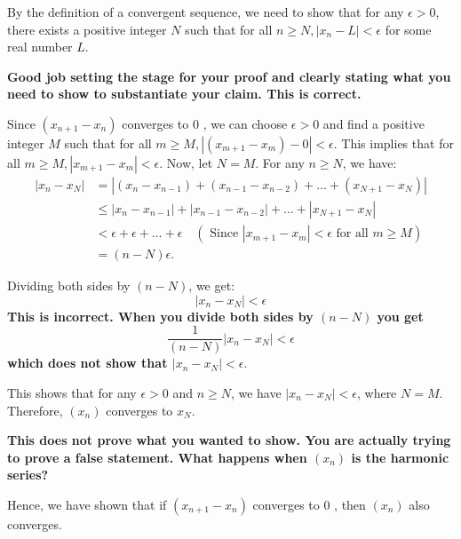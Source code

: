 \documentclass{report}
\begin{document}
By the definition of a convergent sequence, we need to show that for any $\epsilon>0$, there exists a positive integer $N$ such that for all $n \geq N,\left|x_n-L\right|<\epsilon$ for some real number $L$.

\textbf{Good job setting the stage for your proof and clearly stating what you need to show to substantiate your claim. This is correct.}

Since $\left(x_{n+1}-x_n\right)$ converges to 0 , we can choose $\epsilon>0$ and find a positive integer $M$ such that for all $m \geq M,\left|\left(x_{m+1}-x_m\right)-0\right|<\epsilon$. This implies that for all $m \geq M,\left|x_{m+1}-x_m\right|<\epsilon$.
Now, let $N=M$. For any $n \geq N$, we have:
$$
\begin{aligned}
\left|x_n-x_N\right| & =\left|\left(x_n-x_{n-1}\right)+\left(x_{n-1}-x_{n-2}\right)+\ldots+\left(x_{N+1}-x_N\right)\right| \\
& \leq\left|x_n-x_{n-1}\right|+\left|x_{n-1}-x_{n-2}\right|+\ldots+\left|x_{N+1}-x_N\right| \\
& <\epsilon+\epsilon+\ldots+\epsilon \quad\left(\text { Since }\left|x_{m+1}-x_m\right|<\epsilon \text { for all } m \geq M\right) \\
& =(n-N) \epsilon .
\end{aligned}
$$

Dividing both sides by $(n-N)$, we get:
$$
\left|x_n-x_N\right|<\epsilon
$$
\textbf{This is incorrect. When you divide both sides by $(n-N)$
you get
$$
\frac{1}{(n-N)}\left|x_n-x_N\right|<\epsilon
$$
which does not show that $\left|x_n-x_N\right|<\epsilon.$ 
}

This shows that for any $\epsilon>0$ and $n \geq N$, we have $\left|x_n-x_N\right|<\epsilon$, where $N=M$. Therefore, $\left(x_n\right)$ converges to $x_N$.

\textbf{This does not prove what you wanted to show. You are actually trying to prove a false statement. What happens when $(x_n)$ is the harmonic series? }

Hence, we have shown that if $\left(x_{n+1}-x_n\right)$ converges to 0 , then $\left(x_n\right)$ also converges.
\end{document}
